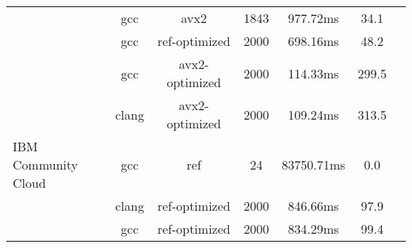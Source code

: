 \begin{table}
\begin{tabularx}{\linewidth}{l c c c c c c}
             &                  gcc &                 avx2 &                 1843 &             977.72ms &                 34.1\\
             &                  gcc &        ref-optimized &                 2000 &             698.16ms &                 48.2\\
             &                  gcc &       avx2-optimized &                 2000 &             114.33ms &                299.5\\
             &                clang &       avx2-optimized &                 2000 &             109.24ms &                313.5\\
             \midrule
         \multirowcell{3}{IBM\\ Community Cloud} &                  gcc &                  ref &                   24 &           83750.71ms &                  0.0\\
         &                clang &        ref-optimized &                 2000 &             846.66ms &                 97.9\\
         &                  gcc &        ref-optimized &                 2000 &             834.29ms &                 99.4 \\
        \bottomrule
    \end{tabularx}
\end{table}